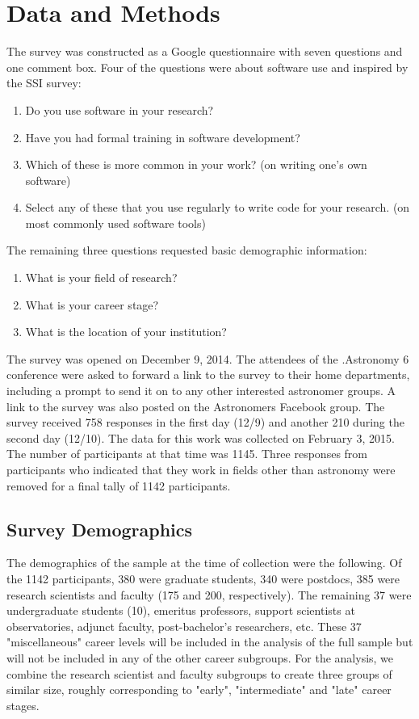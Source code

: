 \section{Data and Methods}
\label{sec:datamethods}

The survey was constructed as a Google questionnaire with seven questions and one comment box. Four of the questions were about software use and inspired by the SSI survey:
\begin{enumerate}
\item Do you use software in your research?
\item Have you had formal training in software development?
\item Which of these is more common in your work? (on writing one's own software)
\item Select any of these that you use regularly to write code for your research. (on most commonly used software tools)
\end{enumerate}
The remaining three questions requested basic demographic information:
\begin{enumerate}
\item What is your field of research?
\item What is your career stage?
\item What is the location of your institution?
\end{enumerate}

The survey was opened on December 9, 2014. The attendees of the .Astronomy 6 conference were asked to forward a link to the survey to their home departments, including a prompt to send it on to any other interested astronomer groups. A link to the survey was also posted on the Astronomers Facebook group. The survey received 758 responses in the first day (12/9) and another 210 during the second day (12/10). The data for this work was collected on February 3, 2015. The number of participants at that time was 1145. Three responses from participants who indicated that they work in fields other than astronomy were removed for a final tally of 1142 participants.

\subsection{Survey Demographics}

The demographics of the sample at the time of collection were the following. Of the 1142 participants, 380 were graduate students, 340 were postdocs, 385 were research scientists and faculty (175 and 200, respectively). The remaining 37 were undergraduate students (10), emeritus professors, support scientists at observatories, adjunct faculty, post-bachelor's researchers, etc. These 37 "miscellaneous" career levels will be included in the analysis of the full sample but will not be included in any of the other career subgroups. For the analysis, we combine the research scientist and faculty subgroups to create three groups of similar size, roughly corresponding to "early", "intermediate" and "late" career stages.

